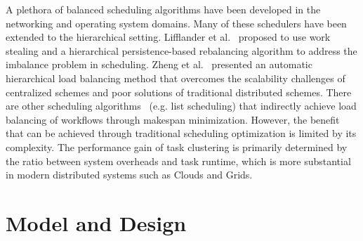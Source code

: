 \documentclass[final]{IEEEtran}
\begin{document}
A plethora of balanced scheduling algorithms have been developed in the networking and operating system domains. Many of these schedulers have been extended to the hierarchical setting. Lifflander et al.~\cite{Lifflander} proposed to use work stealing and a hierarchical persistence-based rebalancing algorithm to address the imbalance problem in scheduling. Zheng et al.~\cite{Zheng} presented an automatic hierarchical load balancing method that overcomes the scalability challenges of centralized schemes and poor solutions of traditional distributed schemes. There are other scheduling algorithms~\cite{Braun2001} (e.g. list scheduling) that indirectly achieve load balancing of workflows through makespan minimization. However, the benefit that can be achieved through traditional scheduling optimization is limited by its complexity. The performance gain of task clustering is primarily determined by the ratio between system overheads and task runtime, which is more substantial in modern distributed systems such as Clouds and Grids. 



\section{Model and Design}
\label{sec:model}
\end{document}
